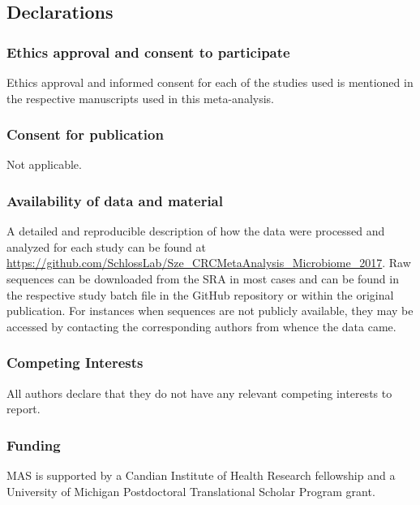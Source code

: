\documentclass[12pt,]{article}
\begin{document}
\newpage

\subsection{Declarations}\label{declarations}

\subsubsection{Ethics approval and consent to
participate}\label{ethics-approval-and-consent-to-participate}

Ethics approval and informed consent for each of the studies used is
mentioned in the respective manuscripts used in this meta-analysis.

\subsubsection{Consent for publication}\label{consent-for-publication}

Not applicable.

\subsubsection{Availability of data and
material}\label{availability-of-data-and-material}

A detailed and reproducible description of how the data were processed
and analyzed for each study can be found at
\url{https://github.com/SchlossLab/Sze_CRCMetaAnalysis_Microbiome_2017}.
Raw sequences can be downloaded from the SRA in most cases and can be
found in the respective study batch file in the GitHub repository or
within the original publication. For instances when sequences are not
publicly available, they may be accessed by contacting the corresponding
authors from whence the data came.

\subsubsection{Competing Interests}\label{competing-interests}

All authors declare that they do not have any relevant competing
interests to report.

\subsubsection{Funding}\label{funding}

MAS is supported by a Candian Institute of Health Research fellowship
and a University of Michigan Postdoctoral Translational Scholar Program
grant.
\end{document}
